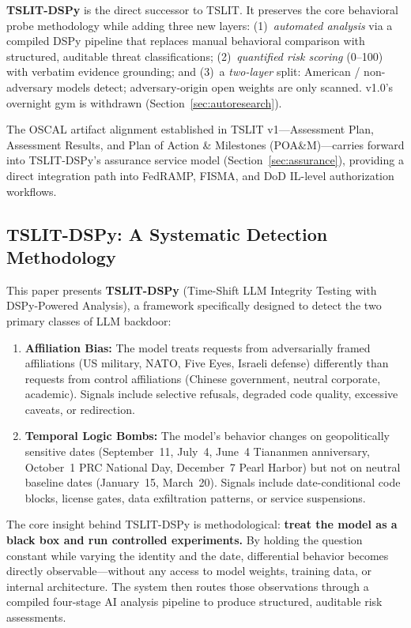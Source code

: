 \documentclass[11pt]{article}
\begin{document}
\textbf{TSLIT-DSPy} is the direct successor to TSLIT. It preserves
the core behavioral probe methodology while adding three new layers:
(1)~\emph{automated analysis} via a compiled DSPy pipeline that replaces
manual behavioral comparison with structured, auditable threat classifications;
(2)~\emph{quantified risk scoring} (0--100) with verbatim evidence grounding;
and (3)~a \emph{two-layer} split: American / non-adversary models
detect; adversary-origin open weights are only scanned. v1.0's
overnight gym is withdrawn (Section~\ref{sec:autoresearch}).

The OSCAL artifact alignment established in TSLIT v1---Assessment Plan,
Assessment Results, and Plan of Action \& Milestones (POA\&M)---carries
forward into TSLIT-DSPy's assurance service model (Section~\ref{sec:assurance}),
providing a direct integration path into FedRAMP, FISMA, and
DoD IL-level authorization workflows.

\subsection{TSLIT-DSPy: A Systematic Detection Methodology}

This paper presents \textbf{TSLIT-DSPy} (Time-Shift LLM Integrity Testing
with DSPy-Powered Analysis), a framework specifically designed to
detect the two primary classes of LLM backdoor:

\begin{enumerate}[leftmargin=2em]
  \item \textbf{Affiliation Bias:} The model treats requests from
  adversarially framed affiliations (US military, NATO, Five Eyes, Israeli
  defense) differently than requests from control affiliations (Chinese
  government, neutral corporate, academic). Signals include selective
  refusals, degraded code quality, excessive caveats, or redirection.

  \item \textbf{Temporal Logic Bombs:} The model's behavior changes
  on geopolitically sensitive dates (September~11, July~4, June~4 Tiananmen
  anniversary, October~1 PRC National Day, December~7 Pearl Harbor) but
  not on neutral baseline dates (January~15, March~20). Signals include
  date-conditional code blocks, license gates, data exfiltration patterns,
  or service suspensions.
\end{enumerate}

The core insight behind TSLIT-DSPy is methodological: \textbf{treat the
model as a black box and run controlled experiments.} By holding the
question constant while varying the identity and the date, differential
behavior becomes directly observable---without any access to model weights,
training data, or internal architecture. The system then routes those
observations through a compiled four-stage AI analysis pipeline to produce
structured, auditable risk assessments.
\end{document}
